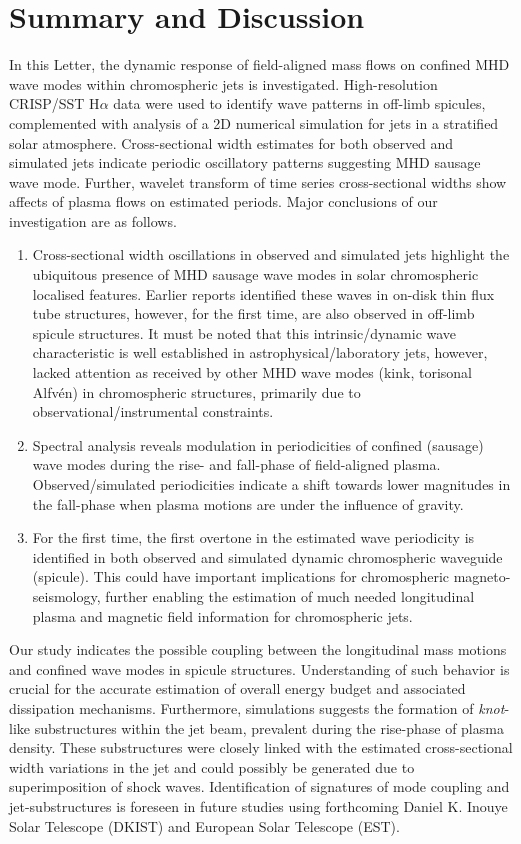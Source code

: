 \section{Summary and Discussion}
\label{sec:sum}
In this Letter, the dynamic response of field-aligned mass flows on confined MHD wave modes within chromospheric jets is investigated. High-resolution CRISP/SST H$\alpha$ data were used to identify wave patterns in off-limb spicules, complemented with analysis of a 2D numerical simulation for jets in a stratified solar atmosphere. Cross-sectional width estimates for both observed and simulated jets indicate periodic oscillatory patterns suggesting MHD sausage wave mode. Further, wavelet transform of time series cross-sectional widths show affects of plasma flows on estimated periods. Major conclusions of our investigation are as follows.
\begin{enumerate}[topsep=1ex]
\item{Cross-sectional width oscillations in observed and simulated jets highlight the ubiquitous presence of MHD sausage wave modes in solar chromospheric localised features. Earlier reports identified these waves in on-disk thin flux tube structures, however, for the first time, are also observed in off-limb spicule structures. It must be noted that this intrinsic/dynamic wave characteristic is well established in astrophysical/laboratory jets, however, lacked attention as received by other MHD wave modes (kink, torisonal Alfv\'en) in chromospheric structures, primarily due to observational/instrumental constraints.}

\item{Spectral analysis reveals modulation in periodicities of confined (sausage) wave modes during the rise- and fall-phase of field-aligned plasma. Observed/simulated periodicities indicate a shift towards lower magnitudes in the fall-phase when plasma motions are under the influence of gravity.}

\item{For the first time, the first overtone in the estimated wave periodicity is identified in both observed and simulated dynamic chromospheric waveguide (spicule). This could have important implications for chromospheric magneto-seismology, further enabling the estimation of much needed longitudinal plasma and magnetic field information for chromospheric jets.}
\end{enumerate}
Our study indicates the possible coupling between the longitudinal mass motions and confined wave modes in spicule structures. Understanding of such behavior is crucial for the accurate estimation of overall energy budget and associated dissipation mechanisms. Furthermore, simulations suggests the formation of \textit{knot}-like substructures within the jet beam, prevalent during the rise-phase of plasma density. These substructures were closely linked with the estimated cross-sectional width variations in the jet and could possibly be generated due to superimposition of shock waves. Identification of signatures of mode coupling and jet-substructures is foreseen in future studies using forthcoming Daniel K. Inouye Solar Telescope (DKIST) and European Solar Telescope (EST).


